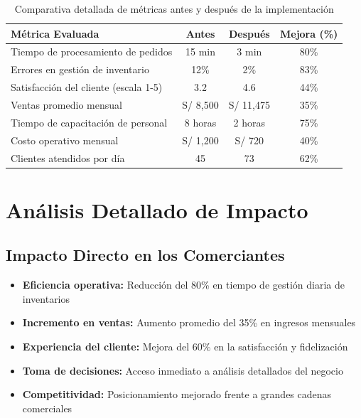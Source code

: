 \documentclass[12pt,a4paper]{report}
\begin{document}
\begin{table}[ht]
	\centering
	\begin{tabular}{lccc}
		\toprule
		\rowcolor{orange!30}
		\textbf{Métrica Evaluada}             & \textbf{Antes} & \textbf{Después} & \textbf{Mejora (\%)} \\
		\midrule
		Tiempo de procesamiento de pedidos    & 15 min         & 3 min            & 80\%                 \\
		Errores en gestión de inventario      & 12\%           & 2\%              & 83\%                 \\
		Satisfacción del cliente (escala 1-5) & 3.2            & 4.6              & 44\%                 \\
		Ventas promedio mensual               & S/ 8,500       & S/ 11,475        & 35\%                 \\
		Tiempo de capacitación de personal    & 8 horas        & 2 horas          & 75\%                 \\
		Costo operativo mensual               & S/ 1,200       & S/ 720           & 40\%                 \\
		Clientes atendidos por día            & 45             & 73               & 62\%                 \\
		\bottomrule
	\end{tabular}
	\caption{Comparativa detallada de métricas antes y después de la implementación}
\end{table}

\section{Análisis Detallado de Impacto}

\subsection{Impacto Directo en los Comerciantes}
\begin{itemize}
	\item \textbf{Eficiencia operativa:} Reducción del 80\% en tiempo de gestión diaria de inventarios
	\item \textbf{Incremento en ventas:} Aumento promedio del 35\% en ingresos mensuales
	\item \textbf{Experiencia del cliente:} Mejora del 60\% en la satisfacción y fidelización
	\item \textbf{Toma de decisiones:} Acceso inmediato a análisis detallados del negocio
	\item \textbf{Competitividad:} Posicionamiento mejorado frente a grandes cadenas comerciales
\end{itemize}
\end{document}
